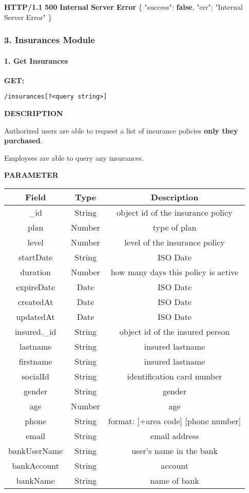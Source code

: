 \documentclass[
]{article}
\newenvironment{Shaded}{}{}
\newcommand{\DataTypeTok}[1]{\textcolor[rgb]{0.56,0.13,0.00}{#1}}
\newcommand{\ErrorTok}[1]{\textcolor[rgb]{1.00,0.00,0.00}{\textbf{#1}}}
\newcommand{\FunctionTok}[1]{\textcolor[rgb]{0.02,0.16,0.49}{#1}}
\newcommand{\KeywordTok}[1]{\textcolor[rgb]{0.00,0.44,0.13}{\textbf{#1}}}
\newcommand{\StringTok}[1]{\textcolor[rgb]{0.25,0.44,0.63}{#1}}
\begin{document}
\begin{Shaded}
\begin{Highlighting}[]
\ErrorTok{HTTP/1.1} \ErrorTok{500} \ErrorTok{Internal} \ErrorTok{Server} \ErrorTok{Error}
\FunctionTok{\{}
    \DataTypeTok{"success"}\FunctionTok{:} \KeywordTok{false}\FunctionTok{,}
    \DataTypeTok{"err"}\FunctionTok{:} \StringTok{"Internal Server Error"}
\FunctionTok{\}}
\end{Highlighting}
\end{Shaded}

\hypertarget{header-n518}{%
\subsubsection{3. Insurances Module}\label{header-n518}}

\hypertarget{header-n519}{%
\paragraph{1. Get Insurances}\label{header-n519}}

\textbf{GET:}

\begin{verbatim}
/insurances[?<query string>]
\end{verbatim}

\textbf{DESCRIPTION}

Authorized users are able to request a list of insurance policies
\textbf{only they purchased}.

Employees are able to query any insurances.

\textbf{PARAMETER}

\begin{longtable}[]{@{}ccc@{}}
\toprule
Field & Type & Description\tabularnewline
\midrule
\endhead
\_id & String & object id of the insurance policy\tabularnewline
plan & Number & type of plan\tabularnewline
level & Number & level of the insurance policy\tabularnewline
startDate & String & ISO Date\tabularnewline
duration & Number & how many days this policy is active\tabularnewline
expireDate & Date & ISO Date\tabularnewline
createdAt & Date & ISO Date\tabularnewline
updatedAt & Date & ISO Date\tabularnewline
insured.\_id & String & object id of the insured person\tabularnewline
lastname & String & insured lastname\tabularnewline
firstname & String & insured lastname\tabularnewline
socialId & String & identification card number\tabularnewline
gender & String & gender\tabularnewline
age & Number & age\tabularnewline
phone & String & format: {[}+area code{]} {[}phone
number{]}\tabularnewline
email & String & email address\tabularnewline
bankUserName & String & user's name in the bank\tabularnewline
bankAccount & String & account\tabularnewline
bankName & String & name of bank\tabularnewline
\bottomrule
\end{longtable}
\end{document}
